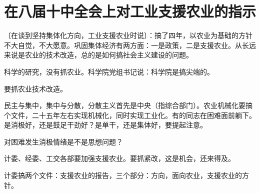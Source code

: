 \section[在八届十中全会上对工业支援农业的指示（一九六二年七月二十四日）]{在八届十中全会上对工业支援农业的指示}


〔在谈到坚持集体化方向，工业支援农业时说〕：搞了四年，以农业为基础的方针不大自觉，不大愿意。巩固集体经济有两方面：一是政策，二是支援农业。从长远来说是农业的技术改造，总的是如何搞社会主义建设的问题。

科学的研究，没有抓农业。科学院党组书记说：科学院是搞尖端的。

要抓农业技术改造。

民主与集中，集中与分散，分散主义首先是中央（指综合部门）。农业机械化要搞个文件，二十五年左右实现机械化，同时实现工业化。有的同志在困难面前躺下。是消极好，还是鼓足干劲好？是单干，还是集体好，要提起注意。

对困难发生消极情绪是不是思想问题？

计委、经委、工交各部要加强支援农业。要抓紧改，这是机会，还来得及。

计委搞两个文件：支援农业的报告，三个部分：方向，面向农业，支援农业的方针。


